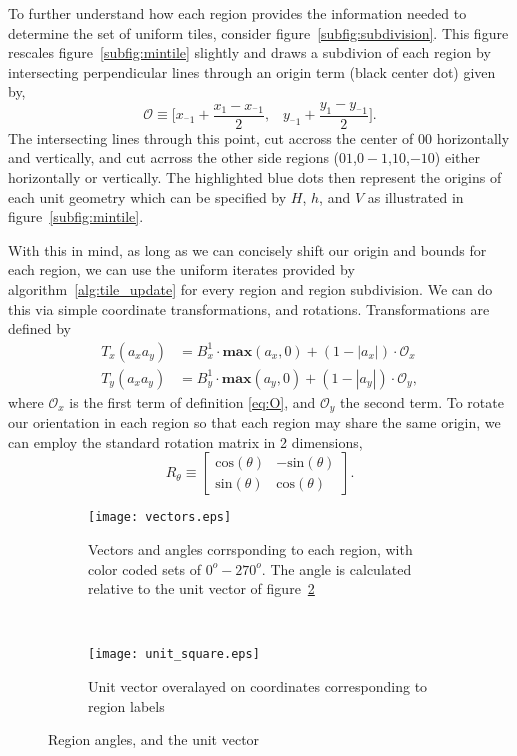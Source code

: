 To further understand how each region provides the information needed to
determine the set of uniform tiles, consider figure~\ref{subfig:subdivision}.
This figure rescales figure~\ref{subfig:mintile} slightly and draws
a subdivion of each region
by intersecting perpendicular lines through an origin term (black center dot)
given by,
\begin{equation}
  \mathcal{O} \equiv \bigl[x_{^-1} + \frac{x_1 - x_{^-1}}{2}, \;\;\; y_{^-1} + \frac{y_1 - y_{^-1}}{2} \bigl].
  \label{eq:O}
\end{equation}
The intersecting lines through this point, cut accross the center of $00$ horizontally and vertically,
and cut acrross the other side regions
($01$,$0-1$,$10$,$-10$) either horizontally or vertically.  The highlighted blue dots then represent the
origins of each unit geometry which can be specified by $H$, $h$, and $V$ as illustrated
in figure~\ref{subfig:mintile}.

With this in mind, as long as we can concisely shift our origin and bounds for each region, we can use the
uniform iterates provided by algorithm~\ref{alg:tile_update} for every region and region subdivision.
We can do this via simple coordinate transformations,
and rotations.  Transformations are defined by
\begin{eqnarray}
  T_x(a_xa_y) &= B_x^1 \cdot \mathbf{max}(a_x,0) + (1 - |a_x|) \cdot \mathcal{O}_x\\
  T_y(a_xa_y) &= B_y^1 \cdot \mathbf{max}(a_y,0) + (1 - |a_y|) \cdot \mathcal{O}_y,
  \label{eq:transforms}
\end{eqnarray}
where $\mathcal{O}_x$ is the first term of definition \ref{eq:O}, and $\mathcal{O}_y$ the second term.  To
rotate our orientation in each region so that each region may share the same origin, we can employ the
standard rotation matrix in 2 dimensions,
\begin{equation}
  R_{\theta} \equiv \begin{bmatrix}
    \text{cos} (\theta) & - \text{sin}(\theta) \\
    \text{sin}(\theta) & \text{cos}(\theta)
    \end{bmatrix}.
\end{equation}

\begin{figure}[h]
  \centering
  \begin{subfigure}[h]{.5\textwidth}
    \centering
    \texttt{[image: vectors.eps]}
    \caption{Vectors and angles corrsponding to each
    region, with color coded sets of $0^o - 270^o$.  The
    angle is calculated relative to the unit vector of
    figure~\ref{subfig:unit}}
    \label{subfig:all_vectors}
  \end{subfigure}
  ~
  \begin{subfigure}[h]{.4\textwidth}
    \centering
    \texttt{[image: unit\_square.eps]}
    \caption{Unit vector overalayed on coordinates
    corresponding to region labels}
    \label{subfig:unit}
    \end{subfigure}
  \caption{Region angles, and the unit vector}
  \label{fig:vectors}
\end{figure}

